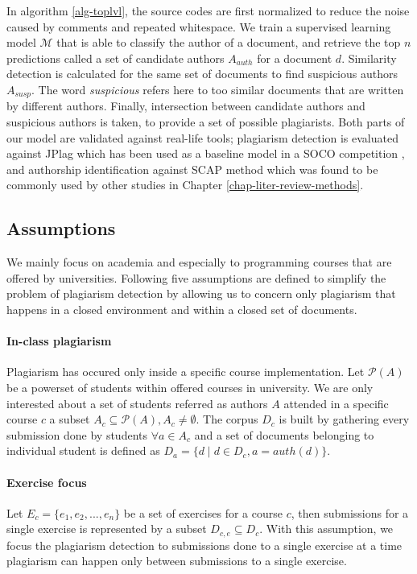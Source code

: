 \noindent
In algorithm \ref{alg-toplvl}, the source codes are first normalized to reduce the noise caused by \eg comments and repeated whitespace. We train a supervised learning model $\mathcal{M}$ that is able to classify the author of a document, and retrieve the top $n$ predictions called a set of candidate authors $A_{auth}$ for a document $d$. Similarity detection is calculated for the same set of documents to find suspicious authors $A_{susp}$. The word \emph{suspicious} refers here to too similar documents that are written by different authors. Finally, intersection between candidate authors and suspicious authors is taken, to provide a set of possible plagiarists. Both parts of our model are validated against real-life tools; plagiarism detection is evaluated against JPlag \cite{prechelt2002finding} which has been used as a baseline model in a SOCO competition \cite{saez2014pan}, and authorship identification against SCAP method which was found to be commonly used by other studies in Chapter \ref{chap-liter-review-methods}.

\subsection{Assumptions}

We mainly focus on academia and especially to programming courses that are offered by 
universities. Following five assumptions are defined to simplify the problem of plagiarism
detection by allowing us to concern only plagiarism that happens in a closed environment and within a closed set of documents. 

\paragraph{In-class plagiarism} Plagiarism has occured only inside a 
specific course implementation. Let $\mathcal{P}(A)$ be a powerset of students within offered courses in university. We are only interested about a set of students referred as authors $A$ attended in a specific course $c$ \ie a subset $A_c \subseteq \mathcal{P}(A), A_c \neq \emptyset$. The corpus $D_c$ is built by gathering every submission done by students $\forall a \in A_c$ and a set of documents belonging to individual student is defined as $D_a = \{d \mid d \in D_c, a = auth(d)\}$. 


\paragraph{Exercise focus} 
Let $E_c = \{e_1, e_2, ..., e_n\}$ be a set of exercises for a course $c$, then submissions for a single exercise is represented by a subset $D_{c,e} \subseteq D_c$. With this assumption, we focus the plagiarism detection to submissions done to a single exercise at a time \ie plagiarism can happen only between submissions to a single exercise.

